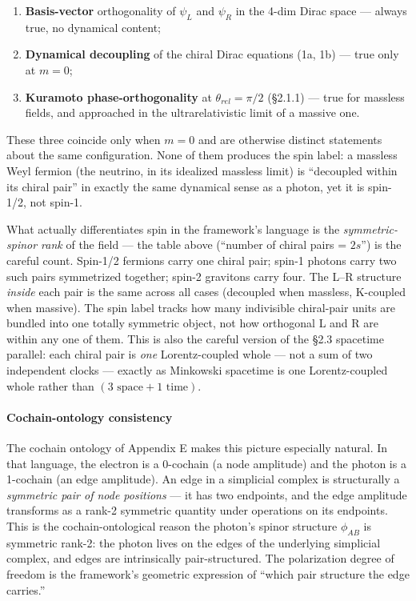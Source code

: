 \documentclass[
]{article}
\begin{document}
\begin{enumerate}
\def\labelenumi{(\roman{enumi})}
\item
  \textbf{Basis-vector} orthogonality of \(\psi_L\) and \(\psi_R\) in
  the 4-dim Dirac space --- always true, no dynamical content;
\item
  \textbf{Dynamical decoupling} of the chiral Dirac equations (1a, 1b)
  --- true only at \(m = 0\);
\item
  \textbf{Kuramoto phase-orthogonality} at \(\theta_{rel} = \pi/2\)
  (§2.1.1) --- true for massless fields, and approached in the
  ultrarelativistic limit of a massive one.
\end{enumerate}

These three coincide only when \(m = 0\) and are otherwise distinct
statements about the same configuration. None of them produces the spin
label: a massless Weyl fermion (the neutrino, in its idealized massless
limit) is ``decoupled within its chiral pair'' in exactly the same
dynamical sense as a photon, yet it is spin-1/2, not spin-1.

What actually differentiates spin in the framework's language is the
\emph{symmetric-spinor rank} of the field --- the table above (``number
of chiral pairs = \(2s\)'') is the careful count. Spin-1/2 fermions
carry one chiral pair; spin-1 photons carry two such pairs symmetrized
together; spin-2 gravitons carry four. The L--R structure \emph{inside}
each pair is the same across all cases (decoupled when massless,
K-coupled when massive). The spin label tracks how many indivisible
chiral-pair units are bundled into one totally symmetric object, not how
orthogonal L and R are within any one of them. This is also the careful
version of the §2.3 spacetime parallel: each chiral pair is \emph{one}
Lorentz-coupled whole --- not a sum of two independent clocks ---
exactly as Minkowski spacetime is one Lorentz-coupled whole rather than
\((3\text{ space} + 1\text{ time})\).

\paragraph{Cochain-ontology
consistency}\label{cochain-ontology-consistency}

The cochain ontology of Appendix E makes this picture especially
natural. In that language, the electron is a 0-cochain (a node
amplitude) and the photon is a 1-cochain (an edge amplitude). An edge in
a simplicial complex is structurally a \emph{symmetric pair of node
positions} --- it has two endpoints, and the edge amplitude transforms
as a rank-2 symmetric quantity under operations on its endpoints. This
is the cochain-ontological reason the photon's spinor structure
\(\phi_{AB}\) is symmetric rank-2: the photon lives on the edges of the
underlying simplicial complex, and edges are intrinsically
pair-structured. The polarization degree of freedom is the framework's
geometric expression of ``which pair structure the edge carries.''
\end{document}
